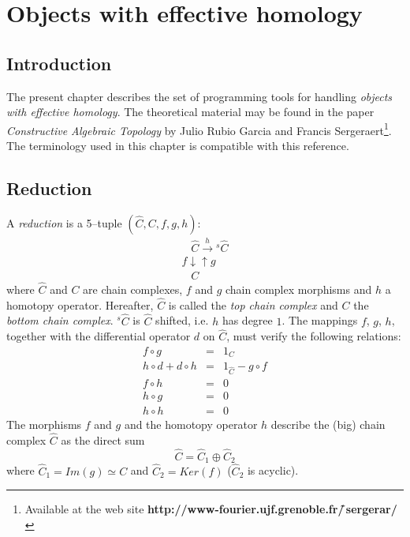 \chapter {Objects with effective homology}

\section {Introduction}

The present chapter describes the set of programming tools for handling
{\em objects with effective homology}. The theoretical material may be 
found in the paper {\em Constructive Algebraic Topology} by
Julio Rubio Garcia and Francis Sergeraert\footnote{Available at the web site
{\bf http://www-fourier.ujf.grenoble.fr/\~\,sergerar/}}.
The terminology used in this
chapter is compatible with this reference.

\section {Reduction}

A {\em reduction} is a 5--tuple $(\hat C, C, f, g, h)$:
$$
\begin{array}{l}
\hspace{10pt} \hat{C} \stackrel{h}{\longrightarrow}\mbox{$^s\hat{C}$} \\
{\scriptstyle f} \downarrow \uparrow {\scriptstyle g}\\
\hspace{10pt} C
\end{array}
$$
where $\hat C$ and $C$ are chain complexes, $f$ and $g$  chain complex morphisms and
$h$ a homotopy operator. Hereafter, $\hat C$ is called the {\em top chain complex}
and $C$ the {\em bottom chain complex}. 
${}^s\hat C$ is $\hat C$ shifted, i.e. $h$ has 
degree $1$. The mappings $f$, $g$, $h$, together with the differential operator $d$ 
on $\hat C$, must verify the following relations:
\newpage
\begin{eqnarray*}
f \circ g & = & 1_C \\
h \circ d + d \circ h & = & 1_{\hat C} - g \circ f \\
f \circ h & = & 0   \\
h \circ g & = & 0   \\
h \circ h & = & 0
\end{eqnarray*}
The morphisms $f$ and $g$ and the homotopy operator $h$ describe the (big) chain
complex $\hat C$ as the direct sum 
$$ \hat C= \hat C_1 \oplus \hat C_2$$
where $\hat C_1 = Im(g) \simeq C$ and  $\hat C_2= Ker(f)$ ($\hat C_2$ is acyclic).

